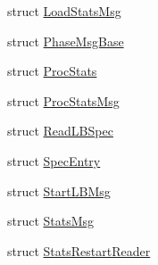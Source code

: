 \begin{DoxyCompactItemize}
struct \hyperlink{structvt_1_1vrt_1_1collection_1_1balance_1_1_load_stats_msg}{Load\+Stats\+Msg}
\item 
struct \hyperlink{structvt_1_1vrt_1_1collection_1_1balance_1_1_phase_msg_base}{Phase\+Msg\+Base}
\item 
struct \hyperlink{structvt_1_1vrt_1_1collection_1_1balance_1_1_proc_stats}{Proc\+Stats}
\item 
struct \hyperlink{structvt_1_1vrt_1_1collection_1_1balance_1_1_proc_stats_msg}{Proc\+Stats\+Msg}
\item 
struct \hyperlink{structvt_1_1vrt_1_1collection_1_1balance_1_1_read_l_b_spec}{Read\+L\+B\+Spec}
\item 
struct \hyperlink{structvt_1_1vrt_1_1collection_1_1balance_1_1_spec_entry}{Spec\+Entry}
\item 
struct \hyperlink{structvt_1_1vrt_1_1collection_1_1balance_1_1_start_l_b_msg}{Start\+L\+B\+Msg}
\item 
struct \hyperlink{structvt_1_1vrt_1_1collection_1_1balance_1_1_stats_msg}{Stats\+Msg}
\item 
struct \hyperlink{structvt_1_1vrt_1_1collection_1_1balance_1_1_stats_restart_reader}{Stats\+Restart\+Reader}
\end{DoxyCompactItemize}
